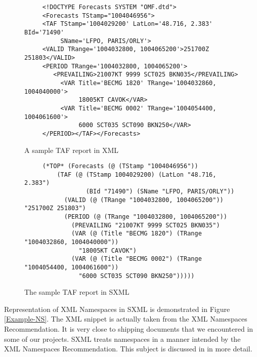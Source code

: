 \documentclass[10pt]{llncs}
\begin{document}
\begin{figure}
\begin{verbatim}
     <!DOCTYPE Forecasts SYSTEM "OMF.dtd">
     <Forecasts TStamp="1004046956">
     <TAF TStamp='1004029200' LatLon='48.716, 2.383' BId='71490'
          SName='LFPO, PARIS/ORLY'>
     <VALID TRange='1004032800, 1004065200'>251700Z 251803</VALID>
     <PERIOD TRange='1004032800, 1004065200'>
        <PREVAILING>21007KT 9999 SCT025 BKN035</PREVAILING>
          <VAR Title='BECMG 1820' TRange='1004032860, 1004040000'>
               18005KT CAVOK</VAR>
          <VAR Title='BECMG 0002' TRange='1004054400, 1004061600'>
               6000 SCT035 SCT090 BKN250</VAR>
     </PERIOD></TAF></Forecasts>
\end{verbatim}
\caption{\label{TAF-XML}A sample TAF report in XML}\end{figure}
\begin{figure}
\begin{verbatim}
     (*TOP* (Forecasts (@ (TStamp "1004046956"))
         (TAF (@ (TStamp 1004029200) (LatLon "48.716, 2.383")
                 (BId "71490") (SName "LFPO, PARIS/ORLY"))
           (VALID (@ (TRange "1004032800, 1004065200")) "251700Z 251803")
           (PERIOD (@ (TRange "1004032800, 1004065200"))
             (PREVAILING "21007KT 9999 SCT025 BKN035")
             (VAR (@ (Title "BECMG 1820") (TRange "1004032860, 1004040000"))
               "18005KT CAVOK")
             (VAR (@ (Title "BECMG 0002") (TRange "1004054400, 1004061600"))
               "6000 SCT035 SCT090 BKN250")))))
\end{verbatim}
\caption{\label{TAF-SXML}The sample TAF report in SXML}\end{figure}
Representation of XML Namespaces in SXML is demonstrated in
Figure \ref{Example-NS}. The XML snippet is actually taken from
the XML Namespaces Recommendation. It is very close to shipping
documents that we encountered in some of our projects. SXML treats
namespaces in a manner intended by the XML Namespaces
Recommendation. This subject is discussed in \cite{SXML} in more detail.
\end{document}

